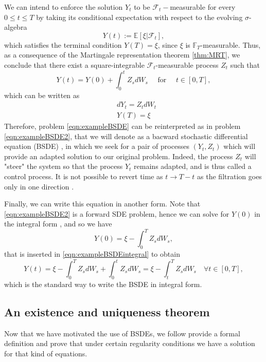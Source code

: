 We can intend to enforce the solution $Y_t$ to be $\mathcal{F}_t-$measurable for every $0 \leq t \leq T $ by taking its conditional expectation with respect to the evolving $\sigma$-algebra
\begin{equation}
	Y(t):=\mathbb{E}[\xi|\mathcal{F}_t],
\end{equation}
which satisfies the terminal condition $Y(T)=\xi$, since $\xi$ is $\mathbb{F}_T$-measurable. Thus, as a consequence of the Martingale representation theorem \ref{thm:MRT}, we conclude that there exist a square-integrable $\mathcal{F}_t$-measurable process $Z_t$ such that 
\begin{equation}
	\label{eqn:exampleBSDEintegral}
	Y(t)=Y(0)+\int_{0}^{t}Z_sdW_s\quad \text{ for } \quad t\in [0,T],
\end{equation}
which can be written as 
\begin{equation}
	\label{eqn:exampleBSDE2}
	\begin{split}
		&dY_t=Z_tdW_t\\
		&Y(T)=\xi
	\end{split}
\end{equation}
Therefore, problem \eqref{eqn:exampleBSDE} can be reinterpreted as in problem \eqref{eqn:exampleBSDE2}, that we will denote as a bacward stochastic differential equation (BSDE) , in which we seek for a pair of processes $(Y_t,Z_t)$ which will provide an adapted solution to our original problem. Indeed, the process $Z_t$ will "steer" the system so that the process $Y_t$ remains adapted, and is thus called a control process. It is not possible to revert time as $t\to T-t$ as the filtration goes only in one direction \cite{chessari_numerical_2022}.

Finally, we can write this equation in another form. Note that \eqref{eqn:exampleBSDE2} is a forward SDE problem, hence we can solve for $Y(0)$ in the integral form , and so we have
\begin{equation}
	Y(0)=\xi-\int_{0}^{T}Z_sdW_s,
\end{equation}
that is inserted in \eqref{eqn:exampleBSDEintegral} to obtain
\begin{equation}
	Y(t)=\xi-\int_{0}^{T}Z_sdW_s+\int_{0}^{t}Z_sdW_s=\xi -\int_{t}^{T}Z_sdW_s \quad \forall t\in[0,T],
\end{equation}
which is the standard way to write the BSDE in integral form.
\subsection{An existence and uniqueness theorem}
Now that we have motivated the use of BSDEs, we follow \cite{pham_continuous-time_2009} provide a formal definition and prove that under certain regularity conditions we have a solution for that kind of equations.

